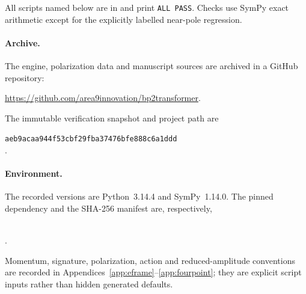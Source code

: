 \documentclass[11pt]{article}
\theoremstyle{definition}
\theoremstyle{remark}
\begin{document}
All scripts named below are in  and print
\texttt{ALL PASS}.  Checks use SymPy exact arithmetic except for the
explicitly labelled near-pole regression.

\paragraph{Archive.}
The engine, polarization data and manuscript sources are archived in a
GitHub repository:
\begin{center}
\url{https://github.com/area9innovation/bp2transformer}.
\end{center}
The immutable verification snapshot and project path are
\begin{center}
\texttt{aeb9acaa944f53cbf29fba37476bfe888c6a1ddd}\\
.
\end{center}

\paragraph{Environment.}
The recorded versions are Python~3.14.4 and SymPy~1.14.0.  The pinned
dependency and the SHA-256 manifest are, respectively,
\begin{center}
\\
.
\end{center}
Momentum, signature, polarization, action and reduced-amplitude
conventions are recorded in
Appendices~\ref{app:eframe}--\ref{app:fourpoint}; they are explicit
script inputs rather than hidden generated defaults.
\end{document}
